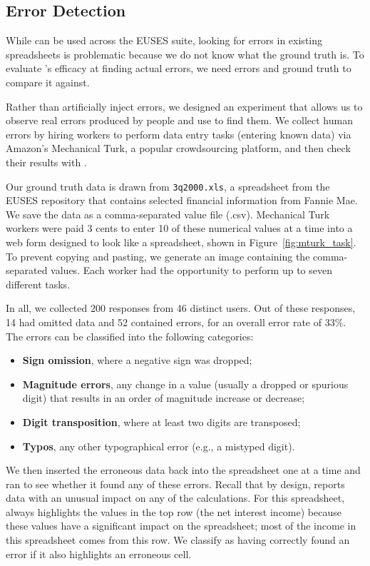 \subsection{Error Detection}
\label{sec:user_study}

While \checkcell{} can be used across the EUSES suite, looking for
errors in existing spreadsheets is problematic because we do not know
what the ground truth is. To evaluate \checkcell{}'s efficacy at
finding actual errors, we need errors and ground truth to compare it
against.

Rather than artificially inject errors, we designed an experiment that
allows us to observe real errors produced by people and use
\checkcell{} to find them. We collect human errors by hiring workers
to perform data entry tasks (entering known data) via Amazon's
Mechanical Turk, a popular crowdsourcing platform, and then check
their results with \checkcell{}.

Our ground truth data is drawn from \texttt{3q2000.xls}, a
spreadsheet from the EUSES repository that contains selected financial
information from Fannie Mae. We save the data as a comma-separated
value file (.csv). Mechanical Turk workers were paid 3 cents to
enter 10 of these numerical values at a time into a web form designed to look
like a spreadsheet, shown in Figure~\ref{fig:mturk_task}. To prevent
copying and pasting, we generate an image containing the
comma-separated values. Each worker had the opportunity to perform up
to seven different tasks.

In all, we collected 200 responses from 46 distinct users. Out of
these responses, 14 had omitted data and 52 contained errors, for an
overall error rate of 33\%. The errors can be classified into the following categories:

\begin{itemize}
\item \textbf{Sign omission}, where a negative sign was dropped;
\item \textbf{Magnitude errors}, any change in a value (usually a dropped or spurious digit) that results in an order of magnitude increase or decrease;
\item \textbf{Digit transposition}, where at least two digits are transposed;
\item \textbf{Typos}, any other typographical error (e.g., a mistyped digit).
\end{itemize}

We then inserted the erroneous data back into the spreadsheet one at a
time and ran \checkcell{} to see whether it found any of these
errors. Recall that by design, \checkcell{} reports data with an
unusual impact on any of the calculations. For this
spreadsheet, \checkcell{} always highlights the values in the top row
(the net interest income) because these values have a significant
impact on the spreadsheet; most of the income in this spreadsheet
comes from this row. We classify \checkcell{} as having correctly
found an error if it also highlights an erroneous cell.

